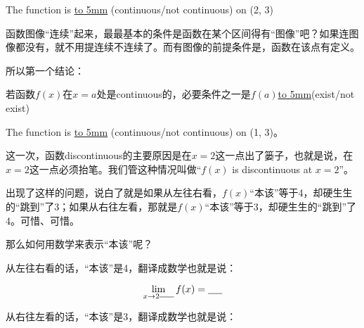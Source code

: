 \documentclass[UTF8]{ctexart}
\begin{document}
\begin{center}
\end{center}

The function is \underline{\hbox to 5mm{}} (continuous/not continuous) on (2, 3)

函数图像“连续”起来，最最基本的条件是函数在某个区间得有“图像”吧？如果连图像都没有，就不用提连续不连续了。而有图像的前提条件是，函数在该点有定义。

所以第一个结论：

若函数$f(x)$在$x=a$处是continuous的，必要条件之一是$f(a)$\underline{\hbox to 5mm{}}(exist/not exist)

\begin{center}
\end{center}

The function is \underline{\hbox to 5mm{}} (continuous/not continuous) on (1, 3)。

这一次，函数discontinuous的主要原因是在$x = 2$这一点出了篓子，也就是说，在$x = 2$这一点必须抬笔。我们管这种情况叫做“$f(x)$ is discontinuous at $x = 2$”。

出现了这样的问题，说白了就是如果从左往右看，$f(x)$“本该”等于4，却硬生生的“跳到”了3；如果从右往左看，那就是$f(x)$“本该”等于3，却硬生生的“跳到”了4。可惜、可惜。

那么如何用数学来表示“本该”呢？

从左往右看的话，“本该”是4，翻译成数学也就是说：

\[{\lim_{x \to 2^{\underline{\hbox to 5mm{}}}} f(x)} = \underline{\hbox to 5mm{}}\]

从右往左看的话，“本该”是3，翻译成数学也就是说：
\end{document}
